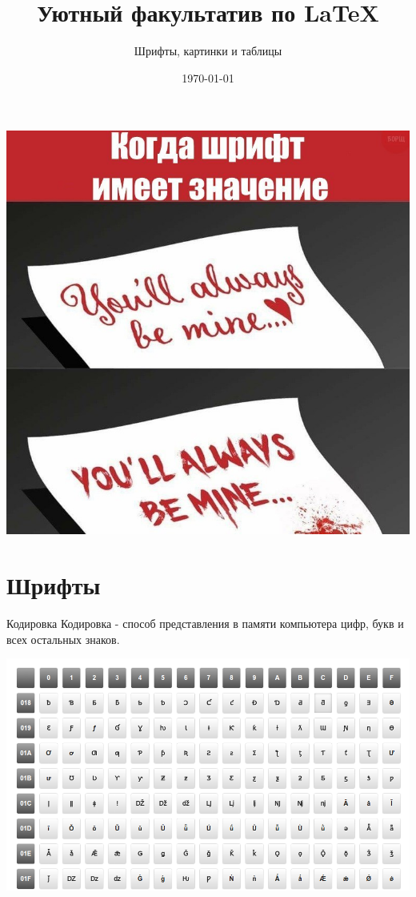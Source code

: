 \documentclass[newPxFont]{beamer}
\title{Уютный факультатив по \LaTeX}
\subtitle{Шрифты, картинки и таблицы}
\date{\today}
\begin{document}
\begingroup
{}
\begin{frame}[plain]
\centering  \includegraphics[width=0.7\linewidth]{font.jpg}	
\end{frame}
\endgroup 

\maketitle
 
\section{Шрифты}  
 
\begin{frame}{Кодировка} 
Кодировка - способ представления в памяти компьютера цифр, букв и всех остальных знаков. 

\centering \includegraphics[width=0.7\linewidth]{codirovka.png}	
\end{frame}
\end{document}
